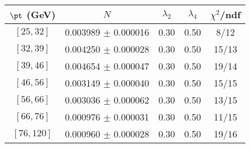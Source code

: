 \begin{tabular}{c||c|c|c|c}
$\pt$ (GeV) & $N$ & $\lambda_{2}$ & $\lambda_4$  & $\chi^2$/ndf  \\
\hline
$[25, 32]$ & 0.003989 $\pm$ 0.000016 & 0.30 & 0.50 & 8/12\\
$[32, 39]$ & 0.004250 $\pm$ 0.000028 & 0.30 & 0.50 & 15/13\\
$[39, 46]$ & 0.004654 $\pm$ 0.000047 & 0.30 & 0.50 & 19/14\\
$[46, 56]$ & 0.003149 $\pm$ 0.000040 & 0.30 & 0.50 & 15/15\\
$[56, 66]$ & 0.003036 $\pm$ 0.000062 & 0.30 & 0.50 & 13/15\\
$[66, 76]$ & 0.000976 $\pm$ 0.000031 & 0.30 & 0.50 & 11/15\\
$[76, 120]$ & 0.000960 $\pm$ 0.000028 & 0.30 & 0.50 & 19/16\\
\end{tabular}
